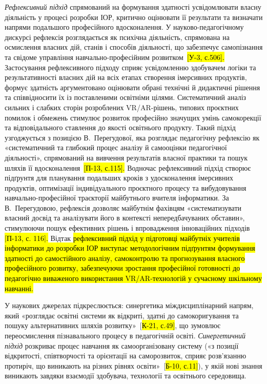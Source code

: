 \emph{Рефлексивний підхід} спрямований на формування здатності усвідомлювати власну діяльність у процесі розробки ІОР, критично оцінювати її результати та визначати напрями подальшого професійного вдосконалення. У науково-педагогічному дискурсі рефлексія розглядається як психічна діяльність, спрямована на осмислення власних дій, станів і способів діяльності, що забезпечує самопізнання та свідоме управління навчально-професійним розвитком~\hl{{[}У-3, с.506{]}.} Застосування рефлексивного підходу сприяє усвідомленню здобувачем логіки та результативності власних дій на всіх етапах створення імерсивних продуктів, формує здатність аргументовано оцінювати обрані технічні й дидактичні рішення та співвідносити їх із поставленими освітніми цілями. Систематичний аналіз сильних і слабких сторін розроблених VR/AR-рішень, типових проєктних помилок і обмежень стимулює розвиток професійно значущих умінь самокорекції та відповідального ставлення до якості освітнього продукту. Такий підхід узгоджується з позицією В.~Перегудової, яка розглядає педагогічну рефлексію як «систематичний та глибокий процес аналізу й самооцінки педагогічної діяльності», спрямований на вивчення результатів власної практики та пошук шляхів її вдосконалення~\hl{{[}П-13, с.115{]}.} Водночас рефлексивний підхід створює підґрунтя для планування подальших кроків з удосконалення імерсивних продуктів, оптимізації індивідуального проєктного процесу та вибудовування навчально-професійної траєкторії майбутнього вчителя інформатики. За В.~Перегудовою, рефлексія дозволяє майбутнім фахівцям «систематизувати власний досвід та аналізувати його в контексті непередбачуваних обставин», стимулюючи пошук ефективних рішень і впровадження інноваційних підходів \hl{{[}П-13, с. 116{]}.} Відтак \hl{рефлексивний підхід у підготовці майбутніх учителів інформатики до розробки ІОР виступає методологічним підґрунтям формування здатності до самостійного аналізу, самоконтролю та прогнозування власного професійного розвитку, забезпечуючи зростання професійної готовності до педагогічно виваженого використання VR/AR-технологій у сучасному шкільному навчанні.}

У наукових джерелах підкреслюється: синергетика міждисциплінарний напрям, який «розглядає освітні системи як відкриті, здатні до самокоригування та пошуку альтернативних шляхів розвитку»~{[}\hl{К-21, с.49{]}}, що зумовлює переосмислення пізнавального процесу в педагогічній освіті. \emph{Синергетичний підхід} розкриває процес навчання як самоорганізовану систему («з позиції відкритості, співтворчості та орієнтації на саморозвиток, сприяє розв'язанню протиріч, що виникають на різних рівнях освіти»~{[}\hl{Б-10, с.11{]}}), у якій нові знання виникають завдяки взаємодії здобувача, технології та освітнього середовища.

